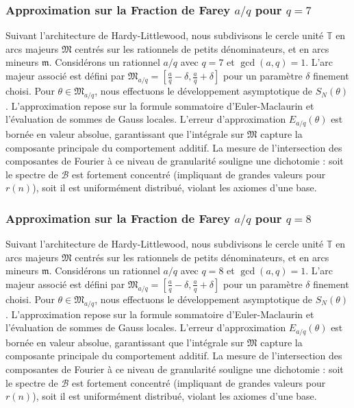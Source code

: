 \documentclass[11pt,a4paper]{article}
\begin{document}
\subsubsection{Approximation sur la Fraction de Farey $a/q$ pour $q=7$}
Suivant l'architecture de Hardy-Littlewood, nous subdivisons le cercle unité $\mathbb{T}$ en arcs majeurs $\mathfrak{M}$ centrés sur les rationnels de petits dénominateurs, et en arcs mineurs $\mathfrak{m}$.
Considérons un rationnel $a/q$ avec $q = 7$ et $\gcd(a,q)=1$. L'arc majeur associé est défini par $\mathfrak{M}_{a/q} = [\frac{a}{q} - \delta, \frac{a}{q} + \delta]$ pour un paramètre $\delta$ finement choisi.
Pour $\theta \in \mathfrak{M}_{a/q}$, nous effectuons le développement asymptotique de $S_N(\theta)$.
L'approximation repose sur la formule sommatoire d'Euler-Maclaurin et l'évaluation de sommes de Gauss locales.
L'erreur d'approximation $E_{a/q}(\theta)$ est bornée en valeur absolue, garantissant que l'intégrale sur $\mathfrak{M}$ capture la composante principale du comportement additif.
La mesure de l'intersection des composantes de Fourier à ce niveau de granularité souligne une dichotomie : soit le spectre de $\mathcal{B}$ est fortement concentré (impliquant de grandes valeurs pour $r(n)$), soit il est uniformément distribué, violant les axiomes d'une base.
\subsubsection{Approximation sur la Fraction de Farey $a/q$ pour $q=8$}
Suivant l'architecture de Hardy-Littlewood, nous subdivisons le cercle unité $\mathbb{T}$ en arcs majeurs $\mathfrak{M}$ centrés sur les rationnels de petits dénominateurs, et en arcs mineurs $\mathfrak{m}$.
Considérons un rationnel $a/q$ avec $q = 8$ et $\gcd(a,q)=1$. L'arc majeur associé est défini par $\mathfrak{M}_{a/q} = [\frac{a}{q} - \delta, \frac{a}{q} + \delta]$ pour un paramètre $\delta$ finement choisi.
Pour $\theta \in \mathfrak{M}_{a/q}$, nous effectuons le développement asymptotique de $S_N(\theta)$.
L'approximation repose sur la formule sommatoire d'Euler-Maclaurin et l'évaluation de sommes de Gauss locales.
L'erreur d'approximation $E_{a/q}(\theta)$ est bornée en valeur absolue, garantissant que l'intégrale sur $\mathfrak{M}$ capture la composante principale du comportement additif.
La mesure de l'intersection des composantes de Fourier à ce niveau de granularité souligne une dichotomie : soit le spectre de $\mathcal{B}$ est fortement concentré (impliquant de grandes valeurs pour $r(n)$), soit il est uniformément distribué, violant les axiomes d'une base.
\end{document}
